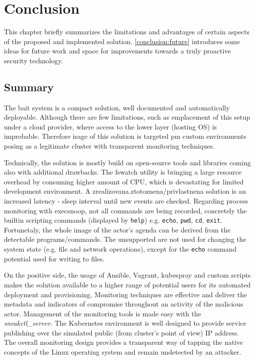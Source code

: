 \chapter{Conclusion \label{conclusion}}
This chapter briefly summarizes the limitations and advantages of certain aspects of the proposed and implemented solution. \autoref{conclusion:future} introduces some ideas for future work and space for improvements towards a truly proactive security technology. 

\section{Summary \label{conclusion:summary}}
The bait system is a compact solution, well documented and automatically deployable. Although there are few limitations, such as emplacement of this setup under a cloud provider, where access to the lower layer (hosting OS) is improbable. Therefore isage of this solution is targeted pm custom environments posing as a legitimate cluster with transparent monitoring techniques.

Technically, the solution is mostly build on open-source tools and libraries coming also with additional drawbacks. The fswatch utility is bringing a large resource overhead by consuming higher amount of CPU, which is devastating for limited development environment. A zrealizovana.ztotoznena/privlastnena solution is an increased latency - sleep interval until new events are checked. Regarding process monitoring with execsnoop, not all commands are being recorded, concretely the builtin scripting commands (displayed by \texttt{help}) e.g. \texttt{echo}, \texttt{pwd}, \texttt{cd}, \texttt{exit}. Fortunetaly, the whole image of the actor's agenda can be derived from the detectable programs/commands. The unsupported are not used for changing the system state (e.g. file and network operations), except for the \texttt{echo} command potential used for writing to files.

On the positive side, the usage of Ansible, Vagrant, kubespray and custom scripts makes the solution available to a higher range of potential users for its automated deployment and provisioning. Monitoring techniques are effective and deliver the metadata and indicators of compromise throughout an activity of the malicious actor. Management of the monitoring tools is made easy with the \textit{sneakctl\_server}. The Kubernetes environment is well designed to provide service publishing over the simulated public (from cluster's point of view) IP address. The overall monitoring design provides a transparent way of tapping the native concepts of the Linux operating system and remain undetected by an attacker.

